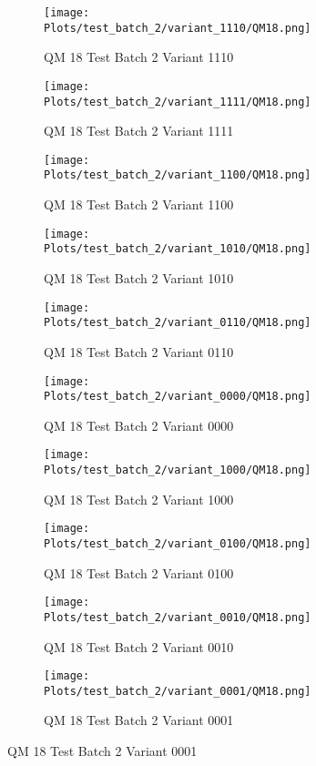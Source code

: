 \documentclass{DissertateFigs}
\begin{document}
\begin{figure}[t!]
    \begin{subfigure}{0.47\textwidth}
    \texttt{[image: Plots/test\_batch\_2/variant\_1110/QM18.png]}
    \caption{QM 18 Test Batch 2 Variant 1110}
    \end{subfigure}
    \begin{subfigure}{0.47\textwidth}
    \texttt{[image: Plots/test\_batch\_2/variant\_1111/QM18.png]}
    \caption{QM 18 Test Batch 2 Variant 1111}
    \end{subfigure}

\medskip

    \begin{subfigure}{0.47\textwidth}
    \texttt{[image: Plots/test\_batch\_2/variant\_1100/QM18.png]}
    \caption{QM 18 Test Batch 2 Variant 1100}
    \end{subfigure}
    \begin{subfigure}{0.47\textwidth}
    \texttt{[image: Plots/test\_batch\_2/variant\_1010/QM18.png]}
    \caption{QM 18 Test Batch 2 Variant 1010}
    \end{subfigure}

\medskip

    \begin{subfigure}{0.47\textwidth}
    \texttt{[image: Plots/test\_batch\_2/variant\_0110/QM18.png]}
    \caption{QM 18 Test Batch 2 Variant 0110}
    \end{subfigure}
    \begin{subfigure}{0.47\textwidth}
    \texttt{[image: Plots/test\_batch\_2/variant\_0000/QM18.png]}
    \caption{QM 18 Test Batch 2 Variant 0000}
    \end{subfigure}

\medskip

    \begin{subfigure}{0.47\textwidth}
    \texttt{[image: Plots/test\_batch\_2/variant\_1000/QM18.png]}
    \caption{QM 18 Test Batch 2 Variant 1000}
    \end{subfigure}
    \begin{subfigure}{0.47\textwidth}
    \texttt{[image: Plots/test\_batch\_2/variant\_0100/QM18.png]}
    \caption{QM 18 Test Batch 2 Variant 0100}
    \end{subfigure}

\medskip

    \begin{subfigure}{0.47\textwidth}
    \texttt{[image: Plots/test\_batch\_2/variant\_0010/QM18.png]}
    \caption{QM 18 Test Batch 2 Variant 0010}
    \end{subfigure}
    \begin{subfigure}{0.47\textwidth}
    \texttt{[image: Plots/test\_batch\_2/variant\_0001/QM18.png]}
    \caption{QM 18 Test Batch 2 Variant 0001}
    \end{subfigure}


\end{figure}
\end{document}
